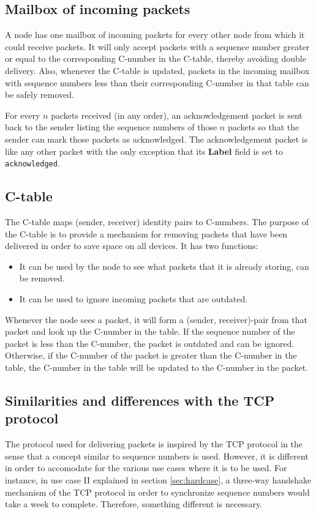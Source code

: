 \documentclass{article}
\begin{document}
\subsection{Mailbox of incoming packets}
A node has one mailbox of incoming packets for every other node from which it could receive packets. It will only accept packets with a sequence number greater or equal to the corresponding C-number in the C-table, thereby avoiding double delivery. Also, whenever the C-table is updated, packets in the incoming mailbox with sequence numbers less than their corresponding C-number in that table can be safely removed. 

For every $n$ packets received (in any order), an acknowledgement packet is sent back to the sender listing the sequence numbers of those $n$ packets so that the sender can mark those packets as acknowledged. The acknowledgement packet is like any other packet with the only exception that its \textbf{Label} field is set to \texttt{acknowledged}.

\subsection{C-table}
The C-table maps (sender, receiver) identity pairs to C-numbers. The purpose of the C-table is to provide a mechanism for removing packets that have been delivered in order to save space on all devices. It has two functions:
\begin{itemize}
  \item It can be used by the node to see what packets that it is already storing, can be removed.
  \item It can be used to ignore incoming packets that are outdated.
\end{itemize}
Whenever the node sees a packet, it will form a (sender, receiver)-pair from that packet and look up the C-number in the table. If the sequence number of the packet is less than the C-number, the packet is outdated and can be ignored. Otherwise, if the C-number of the packet is greater than the C-number in the table, the C-number in the table will be updated to the C-number in the packet.

\subsection{Similarities and differences with the TCP protocol}
The protocol used for delivering packets is inspired by the TCP protocol in the sense that a concept similar to sequence numbers is used. However, it is different in order to accomodate for the various use cases where it is to be used. For instance, in use case II explained in section \ref{sec:hardcase}, a three-way handshake mechanism of the TCP protocol in order to synchronize sequence numbers would take a week to complete. Therefore, something different is necessary.
\end{document}

